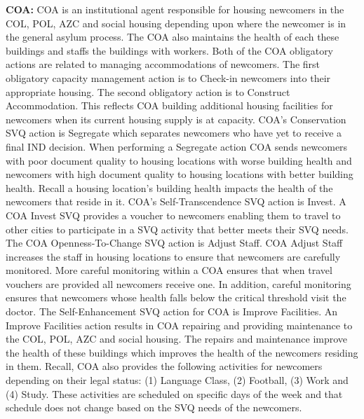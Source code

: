 \documentclass{scspaperproc}
\theoremstyle{scsthe}
\begin{document}
{\bf COA:} COA is an institutional agent responsible for housing newcomers in the COL, POL, AZC and social housing depending upon where the newcomer is in the general asylum process. The COA also maintains the health of each these buildings and staffs the buildings with workers. Both of the COA obligatory actions are related to managing accommodations of newcomers. The first obligatory capacity management action is to Check-in newcomers into their appropriate housing. The second obligatory action is to Construct Accommodation. This reflects COA building additional housing facilities for newcomers when its current housing supply is at capacity. COA's Conservation SVQ action is Segregate which separates newcomers who have yet to receive a final IND decision. When performing a Segregate action COA sends newcomers with poor document quality to housing locations with worse building health and newcomers with high document quality to housing locations with better building health. Recall a housing location's building health impacts the health of the newcomers that reside in it. COA's Self-Transcendence SVQ action is Invest. A COA Invest SVQ provides a voucher to newcomers enabling them to travel to other cities to participate in a SVQ activity that better meets their SVQ needs. The COA Openness-To-Change SVQ action is Adjust Staff. COA Adjust Staff increases the staff in housing locations to ensure that newcomers are carefully monitored. More careful monitoring within a COA ensures that when travel vouchers are provided all newcomers receive one. In addition, careful monitoring ensures that newcomers whose health falls below the critical threshold visit the doctor. The Self-Enhancement SVQ action for COA is Improve Facilities.  An Improve Facilities action results in COA repairing and providing maintenance to the COL, POL, AZC and social housing. The repairs and maintenance improve the health of these buildings which improves the health of the newcomers residing in them. Recall, COA also provides the following activities for newcomers depending on their legal status: (1) Language Class, (2) Football, (3) Work and (4) Study. These activities are scheduled on specific days of the week and that schedule does not change based on the SVQ needs of the newcomers.
\end{document}
